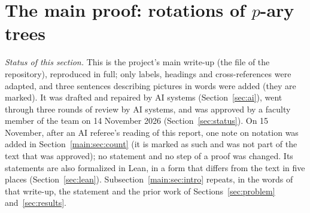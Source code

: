\documentclass[11pt]{article}
\theoremstyle{definition}
\theoremstyle{remark}
\numberwithin{equation}{section}
\numberwithin{figure}{section}
\newcommand{\refnote}[1]{[\emph{Note added on 15 November after an AI referee's report:} #1]}
\begin{document}
\section{The main proof: rotations of $p$-ary trees}\label{sec:mainproof}
\noindent\emph{Status of this section.} This is the project's main write-up (the file  of
the repository), reproduced in full; only labels, headings and cross-references were adapted, and three
sentences describing pictures in words were added (they are marked). It was drafted and repaired by AI
systems (Section~\ref{sec:ai}), went through three rounds of review by AI systems, and was approved by a
faculty member of the team on 14 November 2026 (Section~\ref{sec:status}). On 15 November, after an AI
referee's reading of this report, one note on notation was added in Section~\ref{main:sec:count} (it is marked
as such and was not part of the text that was approved); no statement and no step of a proof was changed.
Its statements are also
formalized in Lean, in a form that differs from the text in five places (Section~\ref{sec:lean}).
Subsection~\ref{main:sec:intro} repeats, in the words of that write-up, the statement and the prior work of
Sections~\ref{sec:problem} and~\ref{sec:results}.


\end{document}
